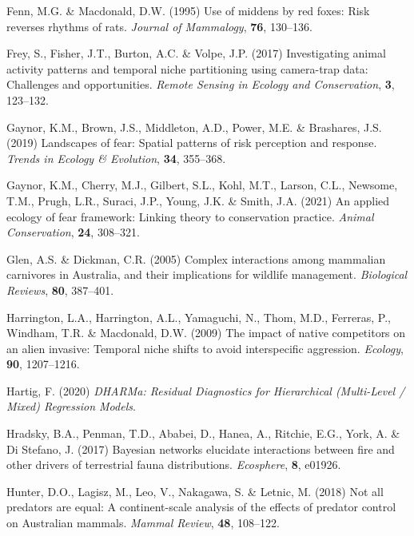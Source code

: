 \documentclass[]{elsarticle} %
\begin{document}
\leavevmode\hypertarget{ref-fenn1995use}{}%
Fenn, M.G. \& Macdonald, D.W. (1995) Use of middens by red foxes: Risk reverses rhythms of rats. \emph{Journal of Mammalogy}, \textbf{76}, 130--136.

\leavevmode\hypertarget{ref-frey2017investigating}{}%
Frey, S., Fisher, J.T., Burton, A.C. \& Volpe, J.P. (2017) Investigating animal activity patterns and temporal niche partitioning using camera-trap data: Challenges and opportunities. \emph{Remote Sensing in Ecology and Conservation}, \textbf{3}, 123--132.

\leavevmode\hypertarget{ref-gaynor2019landscapes}{}%
Gaynor, K.M., Brown, J.S., Middleton, A.D., Power, M.E. \& Brashares, J.S. (2019) Landscapes of fear: Spatial patterns of risk perception and response. \emph{Trends in Ecology \& Evolution}, \textbf{34}, 355--368.

\leavevmode\hypertarget{ref-gaynor2021applied}{}%
Gaynor, K.M., Cherry, M.J., Gilbert, S.L., Kohl, M.T., Larson, C.L., Newsome, T.M., Prugh, L.R., Suraci, J.P., Young, J.K. \& Smith, J.A. (2021) An applied ecology of fear framework: Linking theory to conservation practice. \emph{Animal Conservation}, \textbf{24}, 308--321.

\leavevmode\hypertarget{ref-glen2005complex}{}%
Glen, A.S. \& Dickman, C.R. (2005) Complex interactions among mammalian carnivores in Australia, and their implications for wildlife management. \emph{Biological Reviews}, \textbf{80}, 387--401.

\leavevmode\hypertarget{ref-harrington2009impact}{}%
Harrington, L.A., Harrington, A.L., Yamaguchi, N., Thom, M.D., Ferreras, P., Windham, T.R. \& Macdonald, D.W. (2009) The impact of native competitors on an alien invasive: Temporal niche shifts to avoid interspecific aggression. \emph{Ecology}, \textbf{90}, 1207--1216.

\leavevmode\hypertarget{ref-DHARMa}{}%
Hartig, F. (2020) \emph{DHARMa: Residual Diagnostics for Hierarchical (Multi-Level / Mixed) Regression Models}.

\leavevmode\hypertarget{ref-hradsky2017bayesian}{}%
Hradsky, B.A., Penman, T.D., Ababei, D., Hanea, A., Ritchie, E.G., York, A. \& Di Stefano, J. (2017) Bayesian networks elucidate interactions between fire and other drivers of terrestrial fauna distributions. \emph{Ecosphere}, \textbf{8}, e01926.

\leavevmode\hypertarget{ref-hunter2018not}{}%
Hunter, D.O., Lagisz, M., Leo, V., Nakagawa, S. \& Letnic, M. (2018) Not all predators are equal: A continent-scale analysis of the effects of predator control on Australian mammals. \emph{Mammal Review}, \textbf{48}, 108--122.
\end{document}
